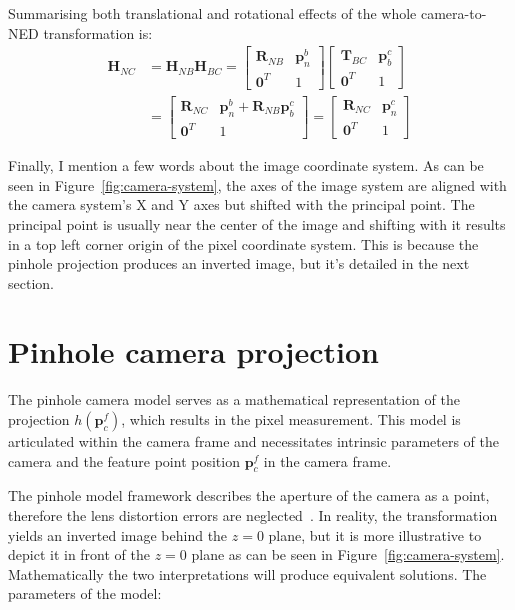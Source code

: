 Summarising both translational and rotational effects of the whole camera-to-NED transformation is:
\begin{equation}
\begin{aligned}
    \mathbf{H}_{NC}&=\mathbf{H}_{NB}\mathbf{H}_{BC} = 
    \begin{bmatrix}
        \mathbf{R}_{NB} & \mathbf{p}_{n}^b\\
        \mathbf{0}^T & 1
    \end{bmatrix} 
    \begin{bmatrix}
        \mathbf{T}_{BC} & \mathbf{p}_b^c\\
        \mathbf{0}^T & 1
    \end{bmatrix} \\ &=
    \begin{bmatrix}
        \mathbf{R}_{NC} & \mathbf{p}_n^b+\mathbf{R}_{NB}\mathbf{p}_b^c \\
        \mathbf{0}^T & 1
    \end{bmatrix} =
    \begin{bmatrix}
        \mathbf{R}_{NC} & \mathbf{p}_n^c \\
        \mathbf{0}^T & 1
    \end{bmatrix}
\end{aligned}
\label{eq:body2camera}
\end{equation}

Finally, I mention a few words about the image coordinate system. As can be seen in Figure~\ref{fig:camera-system}, the axes of the image system are aligned with the camera system's X and Y axes but shifted with the principal point. The principal point is usually near the center of the image and shifting with it results in a top left corner origin of the pixel coordinate system. This is because the pinhole projection produces an inverted image, but it's detailed in the next section.

\section{Pinhole camera projection}

The pinhole camera model serves as a mathematical representation of the projection $h(\mathbf{p}_c^f)$, which results in the pixel measurement. This model is articulated within the camera frame and necessitates intrinsic parameters of the camera and the feature point position $\mathbf{p}_c^f$ in the camera frame. 

The pinhole model framework describes the aperture of the camera as a point, therefore the lens distortion errors are neglected~\cite{pinhole_wikipedia, stanford_camera_models}. In reality, the transformation yields an inverted image behind the $z=0$ plane, but it is more illustrative to depict it in front of the $z=0$ plane as can be seen in Figure~\ref{fig:camera-system}. Mathematically the two interpretations will produce equivalent solutions. The parameters of the model: 

